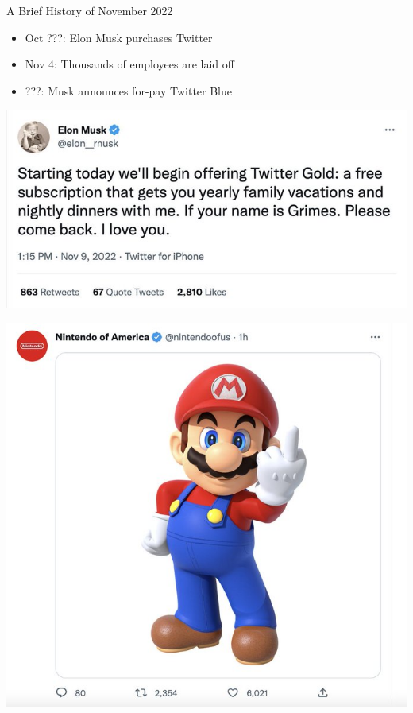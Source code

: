 \documentclass{beamer}
\begin{document}
\begin{frame}{A Brief History of November 2022}
	\begin{itemize}
		\pause
		\item Oct ???: Elon Musk purchases Twitter
		\pause
		\item Nov 4: Thousands of employees are laid off
		\pause
		\item ???: Musk announces for-pay Twitter Blue
	\end{itemize}
\end{frame}
\begin{frame}
	\includegraphics[width = \textwidth]{twitter-gold}
\end{frame}

\begin{frame}
	\includegraphics[height = \textheight]{itsame}
\end{frame}
\end{document}
